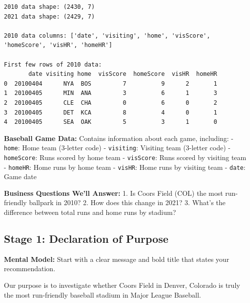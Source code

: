 \documentclass[
  letterpaper,
  DIV=11,
  numbers=noendperiod]{scrartcl}
\begin{document}
\begin{verbatim}
2010 data shape: (2430, 7)
2021 data shape: (2429, 7)

2010 data columns: ['date', 'visiting', 'home', 'visScore', 'homeScore', 'visHR', 'homeHR']

First few rows of 2010 data:
       date visiting home  visScore  homeScore  visHR  homeHR
0  20100404      NYA  BOS         7          9      2       1
1  20100405      MIN  ANA         3          6      1       3
2  20100405      CLE  CHA         0          6      0       2
3  20100405      DET  KCA         8          4      0       1
4  20100405      SEA  OAK         5          3      1       0
\end{verbatim}

\begin{tcolorbox}[enhanced jigsaw, rightrule=.15mm, coltitle=black, colbacktitle=quarto-callout-note-color!10!white, opacitybacktitle=0.6, arc=.35mm, leftrule=.75mm, colback=white, title=\textcolor{quarto-callout-note-color}{\faInfo}\hspace{0.5em}{💡 Understanding the Data}, colframe=quarto-callout-note-color-frame, bottomrule=.15mm, left=2mm, opacityback=0, toptitle=1mm, titlerule=0mm, toprule=.15mm, bottomtitle=1mm, breakable]

\textbf{Baseball Game Data:} Contains information about each game,
including: - \texttt{home}: Home team (3-letter code) -
\texttt{visiting}: Visiting team (3-letter code) - \texttt{homeScore}:
Runs scored by home team - \texttt{visScore}: Runs scored by visiting
team - \texttt{homeHR}: Home runs by home team - \texttt{visHR}: Home
runs by visiting team - \texttt{date}: Game date

\textbf{Business Questions We'll Answer:} 1. Is Coors Field (COL) the
most run-friendly ballpark in 2010? 2. How does this change in 2021? 3.
What's the difference between total runs and home runs by stadium?

\end{tcolorbox}

\subsection{Stage 1: Declaration of
Purpose}\label{stage-1-declaration-of-purpose}

\textbf{Mental Model:} Start with a clear message and bold title that
states your recommendation.

Our purpose is to investigate whether Coors Field in Denver, Colorado is
truly the most run-friendly baseball stadium in Major League Baseball.
\end{document}
